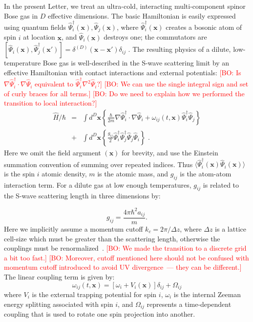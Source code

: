 \documentclass[aps,prl,twocolumn,showpacs,amsmath,amssymb,superscriptaddress]{revtex4-1}
\newcommand{\bogdansremark}[1]{\textcolor{red}{{[}BO: #1{]}}}
\begin{document}
In the present Letter, we treat an ultra-cold,
interacting multi-component spinor Bose gas in $D$ effective dimensions.
The basic Hamiltonian is easily expressed using quantum fields
$\widehat{\Psi}_{i}^{\dagger}({\mathbf{x}}),\widehat{\Psi}_{j}({\mathbf{x}})$,
where $\widehat{\Psi}_{i}^{\dagger}({\mathbf{x}})$ creates a bosonic atom of spin $i$
at location $\mathbf{x}$, and $\widehat{\Psi}_{i}({\mathbf{x}})$ destroys one;
the commutators are
$[\widehat{\Psi}_{i}(\mathbf{x}),\widehat{\Psi}_{j}^{\dagger}(\mathbf{x}')] =
\delta^{(D)}(\mathbf{x}-\mathbf{x}')\delta_{ij}\,\,.$
The resulting physics of a dilute, low-temperature Bose gas
is well-described in the S-wave scattering limit by an effective Hamiltonian
with contact interactions and external potentials:
	\bogdansremark{Is $\nabla \widehat{\Psi}_{i}^{\dagger} \cdot \nabla \widehat{\Psi}_{i}$
	equivalent to $\widehat{\Psi}_{i}^{\dagger} \nabla^2 \widehat{\Psi}_{i}$?}
	\bogdansremark{We can use the single integral sign and set of curly braces for all terms.}
	\bogdansremark{Do we need to explain how we performed the transition to local interaction?}
\begin{eqnarray}
	\widehat{H}/\hbar & = & \int d^{D}{\mathbf{x}} \left\{
		\frac{\hbar}{2m}{\nabla} \widehat{\Psi}_{i}^{\dagger} \cdot {\nabla} \widehat{\Psi}_{i} +
		\omega_{ij}(t,{\mathbf{x}}) \widehat{\Psi}_{i}^{\dagger} \widehat{\Psi}_{j}
	\right\} \nonumber \\
	& + & \int d^{D}{\mathbf{x}} \left\{
		\frac{g_{ij}}{2} \widehat{\Psi}_{i}^{\dagger} \widehat{\Psi}_{j}^{\dagger}
		\widehat{\Psi}_{j} \widehat{\Psi}_{i}
	\right\} \,\,.
\end{eqnarray}
Here we omit the field argument $({\mathbf{x}})$ for brevity,
and use the Einstein summation convention of summing over repeated indices.
Thus $\langle \widehat{\Psi}_{i}^{\dagger}({\mathbf{x}}) \widehat{\Psi}_{i}({\mathbf{x}}) \rangle$
is the spin $i$ atomic density, $m$ is the atomic mass,
and $g_{ij}$ is the atom-atom interaction term.
For a dilute gas at low enough temperatures,
$g_{ij}$ is related to the S-wave scattering length in three dimensions by:

\begin{equation}
	g_{ij}=\frac{4\pi\hbar^{2}a_{ij}}{m}.
\end{equation}
Here we implicitly assume a momentum cutoff $k_{c}=2\pi/\Delta z$,
where $\Delta z$ is a lattice cell-size which must be greater than the scattering length,
otherwise the couplings must be renormalized~\cite{Sinatra2002}.
	\bogdansremark{We made the transition to a discrete grid a bit too fast.}
	\bogdansremark{Moreover, cutoff mentioned here should not be confused with momentum cutoff
	introduced to avoid UV divergence~--- they can be different.}
The linear coupling term is given by:
\begin{equation}
	\omega_{ij}(t,{\mathbf{x}}) = \left[
		\omega_{i}+V_{i} \left( \mathbf{x} \right)
	\right] \delta_{ij} + \Omega_{ij}
\end{equation}
where $V_{i}$ is the external trapping potential for spin $i$,
$\omega_{i}$ is the internal Zeeman energy splitting associated with spin $i$,
and $\Omega_{ij}$ represents a time-dependent coupling
that is used to rotate one spin projection into another.
\end{document}
